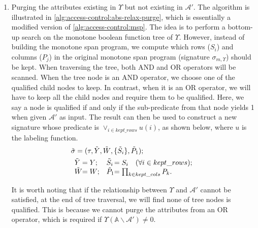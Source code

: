 \begin{enumerate}
  \item Purging the attributes existing in $\Upsilon$ but not existing in $\mathcal{A}'$.
    The algorithm is illustrated in \cref{alg:access-control:abs-relax-purge}, which is essentially a modified version of \cref{alg:access-control:msp}.
    The idea is to perform a bottom-up search on the monotone boolean function tree of $\Upsilon$. However, instead of building the monotone span program, we compute which rows ($S_i$) and columns ($P_j$) in the original monotone span program (signature $\sigma_{m, \Upsilon}$) should be kept. When traversing the tree, both AND and OR operators will be scanned. When the tree node is an AND operator, we choose one of the qualified child nodes to keep. In contrast, when it is an OR operator, we will have to keep all the child nodes and require them to be qualified. Here, we say a node is qualified if and only if the sub-predicate from that node yields 1 when given $\mathcal{A}'$ as input. The result can then be used to construct a new signature whose predicate is $\lor_{i \in kept\_rows} u(i)$, as shown below, where $u$ is the labeling function.
    \begin{align*}
              & \tilde{\sigma} = (\tau, \tilde{Y},\tilde{W},\{\tilde{S}_i\}, \tilde{P}_1); \\
              &\begin{array}{l@{}ll@{}l}
                \tilde{Y} & = Y; &
                \tilde{S}_i & = S_i \quad (\forall i \in kept\_rows);
                \\
                \tilde{W} & = W; &
                \tilde{P}_1 & = \prod_{k \in kept\_cols}{P_k}.
              \end{array}
    \end{align*}

    It is worth noting that if the relationship between $\Upsilon$ and $\mathcal{A}'$ cannot be satisfied, at the end of tree traversal, we will find none of tree nodes is qualified. This is because we cannot purge the attributes from an OR operator, which is required if $\Upsilon(\mathbb{A}\backslash\mathcal{A}') \neq 0$.


\end{enumerate}
